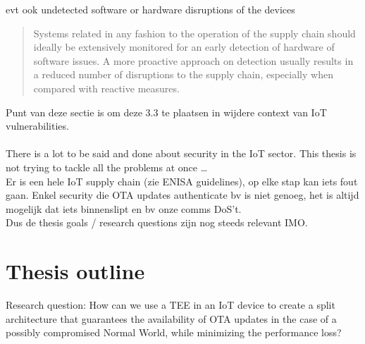 evt ook undetected software or hardware disruptions of the devices \begin{quote}
    Systems related in any fashion to the operation of the supply chain should
ideally be extensively monitored for an early detection of hardware of
software issues. A more proactive approach on detection usually results in
a reduced number of disruptions to the supply chain, especially when
compared with reactive measures.
\end{quote}
Punt van deze sectie is om deze 3.3 te plaatsen in wijdere context van IoT vulnerabilities.\\
\\
There is a lot to be said and done about security in the IoT sector. This thesis is not trying to tackle all the problems at once \dots
\\
Er is een hele IoT supply chain (zie ENISA guidelines), op elke stap kan iets fout gaan. Enkel security die OTA updates authenticate bv is niet genoeg, het is altijd mogelijk dat iets binnenslipt en bv onze comms DoS't. \\
Dus de thesis goals / research questions zijn nog steeds relevant IMO.\\

\section{Thesis outline}
Research question: How can we use a TEE in an IoT device to create a split architecture that guarantees the availability of OTA updates in the case of a possibly compromised Normal World, while minimizing the performance loss? 
